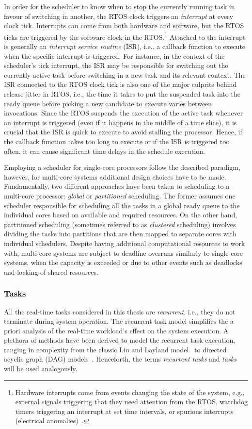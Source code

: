 In order for the scheduler to know when to stop the currently running task in favour of switching in another, the RTOS clock triggers an \emph{interrupt} at every clock tick.
Interrupts can come from both hardware and software, but the RTOS ticks are triggered by the software clock in the RTOS.\footnote{Hardware interrupts come from events changing the state of the system, e.g., external signals triggering that they need attention from the RTOS, watchdog timers triggering an interrupt at set time intervals, or spurious interrupts (electrical anomalies)~\cite{Drepper:2003}.}
Attached to the interrupt is generally an \emph{interrupt service routine} (ISR), i.e., a callback function to execute when the specific interrupt is triggered.
For instance, in the context of the scheduler's tick interrupt, the ISR may be responsible for switching out the currently active task before switching in a new task and its relevant context.
The ISR connected to the RTOS clock tick is also one of the major culprits behind release jitter in RTOS, i.e., the time it takes to put the suspended task into the ready queue before picking a new candidate to execute varies between invocations.
Since the RTOS suspends the execution of the active task whenever an interrupt is triggered (even if it happens in the middle of a time slice), it is crucial that the ISR is quick to execute to avoid stalling the processor.
Hence, if the callback function takes too long to execute or if the ISR is triggered too often, it can cause significant time delays in the schedule execution.

Employing a scheduler for single-core processors follow the described paradigm, however, for multi-core systems additional design choices have to be made.
Fundamentally, two different approaches have been taken to scheduling to a multi-core processor: \emph{global} or \emph{partitioned} scheduling.
The former assumes one scheduler responsible for scheduling all the tasks in a global ready queue to the individual cores based on available and required resources.
On the other hand, partitioned scheduling (sometimes referred to as \emph{clustered} scheduling) involves dividing the tasks into partitions that are then mapped to separate cores with individual schedulers.
Despite having additional computational resources to work with, multi-core systems are subject to deadline overruns similarly to single-core systems, when the capacity is exceeded or due to other events such as deadlocks and locking of shared resources.


\subsubsection*{Tasks}%
All the real-time tasks considered in this thesis are \emph{recurrent}, i.e., they do not terminate during system operation.
The recurrent task model simplifies the a priori analysis of the real-time workload's effect on the system execution.
A plethora of methods have been derived to model the recurrent task execution, ranging in complexity from the classic Liu and Layland model~\cite{Liu:1973} to directed acyclic graph (DAG) models~\cite{Saifullah:2014}.
Henceforth, the terms \emph{recurrent tasks} and \emph{tasks} will be used analogously.

